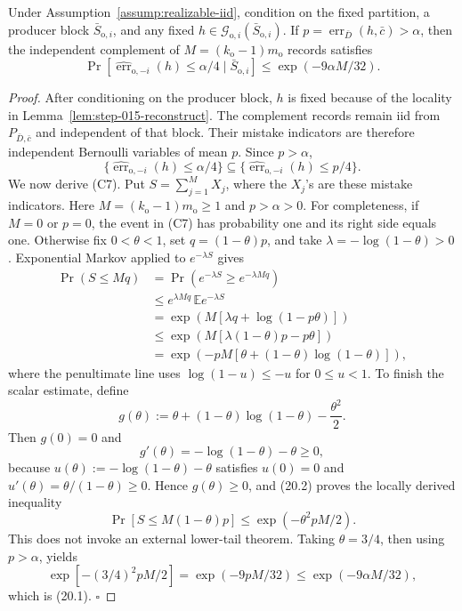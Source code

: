 \begin{lemma}\label{lem:step-015-lower-tail}
Under Assumption~\ref{assump:realizable-iid}, condition on the fixed
partition, a producer block \(\bar S_{\mathrm o,i}\), and any fixed
\(h\in\mathcal G_{\mathrm o,i}(\bar S_{\mathrm o,i})\). If
\(p=\operatorname{err}_{\bar D}(h,\bar c)>\alpha\), then the independent
complement of \(M=(k_{\mathrm o}-1)m_{\mathrm o}\) records satisfies
\[
\Pr[
\widehat{\operatorname{err}}_{\mathrm o,-i}(h)\le\alpha/4
\mid\bar S_{\mathrm o,i}]
\le\exp(-9\alpha M/32).
\tag{20.1}
\]


\end{lemma}

\begin{proof}
After conditioning on the producer block, \(h\) is fixed because of the
locality in Lemma~\ref{lem:step-015-reconstruct}. The complement records
remain iid from \(P_{\bar D,\bar c}\) and independent of that block.
Their mistake indicators are therefore independent Bernoulli variables of
mean \(p\). Since \(p>\alpha\),
\[
\{\widehat{\operatorname{err}}_{\mathrm o,-i}(h)\le\alpha/4\}
\subseteq
\{\widehat{\operatorname{err}}_{\mathrm o,-i}(h)\le p/4\}.
\]
We now derive (C7). Put \(S=\sum_{j=1}^M X_j\), where the \(X_j\)'s are
these mistake indicators. Here
\(M=(k_{\mathrm o}-1)m_{\mathrm o}\ge1\) and \(p>\alpha>0\). For
completeness, if \(M=0\) or \(p=0\), the event in (C7) has probability one
and its right side equals one. Otherwise fix \(0<\theta<1\), set
\(q=(1-\theta)p\), and take
\(\lambda=-\log(1-\theta)>0\). Exponential Markov applied to
\(e^{-\lambda S}\) gives
\[
\begin{aligned}
\Pr(S\le Mq)
&=\Pr(e^{-\lambda S}\ge e^{-\lambda Mq})\\
&\le e^{\lambda Mq}\,\mathbb E e^{-\lambda S}\\
&=\exp\!\left(M[\lambda q+\log(1-p\theta)]\right)\\
&\le\exp\!\left(M[\lambda(1-\theta)p-p\theta]\right)\\
&=\exp\!\left(-pM[\theta+(1-\theta)\log(1-\theta)]\right),
\end{aligned}
\tag{20.2}
\]
where the penultimate line uses \(\log(1-u)\le-u\) for \(0\le u<1\).
To finish the scalar estimate, define
\[
g(\theta):=\theta+(1-\theta)\log(1-\theta)-\frac{\theta^2}{2}.
\]
Then \(g(0)=0\) and
\[
g'(\theta)=-\log(1-\theta)-\theta\ge0,
\tag{20.3}
\]
because \(u(\theta):=-\log(1-\theta)-\theta\) satisfies
\(u(0)=0\) and \(u'(\theta)=\theta/(1-\theta)\ge0\). Hence
\(g(\theta)\ge0\), and (20.2) proves the locally derived inequality
\[
 \Pr[S\le M(1-\theta)p]
 \le\exp(-\theta^2pM/2).
\tag{C7}
\]
This does not invoke an external lower-tail theorem. Taking
\(\theta=3/4\), then using \(p>\alpha\), yields
\[
\exp[-(3/4)^2pM/2]
=\exp(-9pM/32)
\le\exp(-9\alpha M/32),
\]
which is (20.1). \(\square\)


\end{proof}

